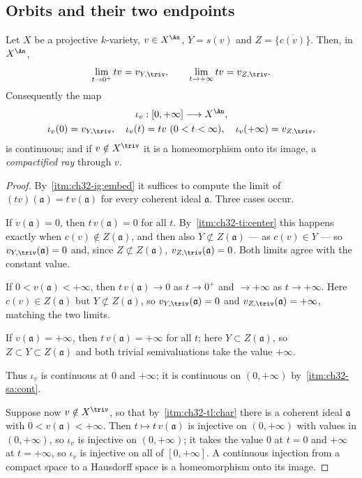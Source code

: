 \subsection{Orbits and their two endpoints}
\label{sec:ch32-orbits}

\begin{proposition}
\label{prop:ch32-scaling-limits}
Let $X$ be a projective $k$-variety, $v\in X^{\An}$, $Y=s(v)$ and
$Z=\overline{\{c(v)\}}$.  Then, in $X^{\An}$,
\[
 \lim_{t\to0^+}tv=v_{Y,\triv},
 \qquad
 \lim_{t\to+\infty}tv=v_{Z,\triv}.
\]
Consequently the map
\[
\begin{gathered}
 \iota_v:[0,+\infty]\longrightarrow X^{\An},\\
 \iota_v(0)=v_{Y,\triv},\quad
 \iota_v(t)=tv\ (0<t<\infty),\quad
 \iota_v(+\infty)=v_{Z,\triv},
\end{gathered}
\]
is continuous; and if $v\notin X^{\triv}$ it is a homeomorphism onto its
image, a \emph{compactified ray} through $v$.
\end{proposition}

\begin{proof}
By \,\cref{itm:ch32-ig:embed} it suffices to
compute the limit of $(tv)(\mathfrak a)=t\,v(\mathfrak a)$ for every
coherent ideal $\mathfrak a$.  Three cases occur.

If $v(\mathfrak a)=0$, then $t\,v(\mathfrak a)=0$ for all $t$.  By
\,\cref{itm:ch32-ti:center} this happens
exactly when $c(v)\notin Z(\mathfrak a)$, and then also
$Y\not\subset Z(\mathfrak a)$ --- as $c(v)\in Y$ --- so
$v_{Y,\triv}(\mathfrak a)=0$ and, since $Z\not\subset Z(\mathfrak a)$,
$v_{Z,\triv}(\mathfrak a)=0$.  Both limits agree with the constant value.

If $0<v(\mathfrak a)<+\infty$, then $t\,v(\mathfrak a)\to0$ as
$t\to0^+$ and $\to+\infty$ as $t\to+\infty$.  Here
$c(v)\in Z(\mathfrak a)$ but $Y\not\subset Z(\mathfrak a)$, so
$v_{Y,\triv}(\mathfrak a)=0$ and $v_{Z,\triv}(\mathfrak a)=+\infty$,
matching the two limits.

If $v(\mathfrak a)=+\infty$, then $t\,v(\mathfrak a)=+\infty$ for all
$t$; here $Y\subset Z(\mathfrak a)$, so $Z\subset Y\subset
Z(\mathfrak a)$ and both trivial semivaluations take the value $+\infty$.

Thus $\iota_v$ is continuous at $0$ and $+\infty$; it is continuous on
$(0,+\infty)$ by \,\cref{itm:ch32-sa:cont}.

Suppose now $v\notin X^{\triv}$, so that by
\,\cref{itm:ch32-tl:char} there is a coherent
ideal $\mathfrak a$ with $0<v(\mathfrak a)<+\infty$.  Then
$t\mapsto t\,v(\mathfrak a)$ is injective on $(0,+\infty)$ with values in
$(0,+\infty)$, so $\iota_v$ is injective on $(0,+\infty)$; it takes
the value $0$ at $t=0$ and $+\infty$ at $t=+\infty$, so
$\iota_v$ is injective on all of $[0,+\infty]$.  A continuous injection
from a compact space to a Hausdorff space is a homeomorphism onto its image.
\end{proof}

